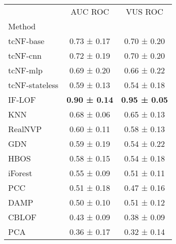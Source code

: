 \begin{tabular}{lcc}
 & AUC ROC & VUS ROC \\
Method &  &  \\
\midrule
tcNF-base & 0.73 ± 0.17 & 0.70 ± 0.20 \\
tcNF-cnn & 0.72 ± 0.19 & 0.70 ± 0.20 \\
tcNF-mlp & 0.69 ± 0.20 & 0.66 ± 0.22 \\
tcNF-stateless & 0.59 ± 0.13 & 0.54 ± 0.18 \\
\midrule
IF-LOF & \bfseries 0.90 ± 0.14 & \bfseries 0.95 ± 0.05 \\
KNN & 0.68 ± 0.06 & 0.65 ± 0.13 \\
RealNVP & 0.60 ± 0.11 & 0.58 ± 0.13 \\
GDN & 0.59 ± 0.19 & 0.54 ± 0.22 \\
HBOS & 0.58 ± 0.15 & 0.54 ± 0.18 \\
iForest & 0.55 ± 0.09 & 0.51 ± 0.11 \\
PCC & 0.51 ± 0.18 & 0.47 ± 0.16 \\
DAMP & 0.50 ± 0.10 & 0.51 ± 0.12 \\
CBLOF & 0.43 ± 0.09 & 0.38 ± 0.09 \\
PCA & 0.36 ± 0.17 & 0.32 ± 0.14 \\
\end{tabular}

